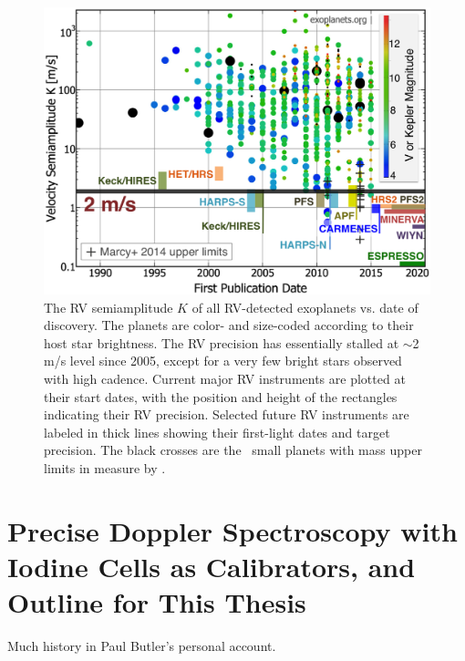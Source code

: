 \begin{figure}
\centering
\includegraphics[scale=0.55]{introduction/family-big-carmenes.eps}
\caption{The RV semiamplitude $K$ of all RV-detected exoplanets
  vs. date of discovery. The planets are color- and size-coded according
  to their host star brightness. The RV precision has essentially
  stalled at $\sim$2 m/s level since 2005, except for a very few bright
  stars observed with high cadence. Current major RV instruments are
  plotted at their start dates, with the position and height of the
  rectangles indicating their RV precision. Selected future RV
  instruments are labeled in thick lines showing their first-light dates
  and target precision. The black crosses are the \kepler\ small planets
  with mass upper limits in \cite{marcy2014} measure by \keck.
\label{intro:fig:family}}
\end{figure}



\section{Precise Doppler Spectroscopy with Iodine Cells as
  Calibrators, and Outline for This Thesis} 




Much history in Paul Butler's personal account.

